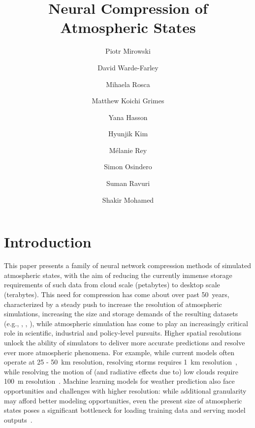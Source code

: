 \documentclass[11pt, a4paper, logo, copyright, numbering]{googledeepmind}
\title{Neural Compression of Atmospheric States}
\author[1,*]{Piotr Mirowski}
\author[1,*]{David Warde-Farley}
\author[1]{Mihaela Rosca}
\author[1]{Matthew Koichi Grimes}
\author[1]{Yana Hasson}
\author[1]{Hyunjik Kim}
\author[1]{Mélanie Rey}
\author[1]{Simon Osindero}
\author[1,\Cross]{Suman Ravuri}
\author[1,\Cross]{Shakir Mohamed}
\affil[*]{Equal contributions}
\affil[1]{Google DeepMind}
\affil[\Cross]{Senior authors}
\begin{document}
\maketitle



\section{Introduction}
\label{sx:introduction}

This paper presents a family of neural network compression methods of simulated atmospheric states, with the aim of reducing the currently immense storage requirements of such data from cloud scale (petabytes) to desktop scale (terabytes). 
This need for compression has come about over past 50~years, characterized by a steady push to increase the resolution of atmospheric simulations, increasing the size and storage demands of the resulting datasets (e.g., \citet{neumann2019assessing}, \citet{schneider2023harnessing}, \citet{essd-16-2113-2024}), while atmospheric simulation has come to play an increasingly critical role in scientific, industrial and policy-level pursuits.
Higher spatial resolutions unlock the ability of simulators to deliver more accurate predictions and resolve ever more atmospheric phenomena.
For example, while current models often operate at 25 - 50~km resolution, resolving storms requires 1~km resolution~\citep{stevens2020added}, while resolving the motion of (and radiative effects due to) low clouds require 100~m resolution~\citep{schneider2017earth,satoh2019global}.
Machine learning models for weather prediction also face opportunities and challenges with higher resolution: while additional granularity may afford better modeling opportunities, even the present size of atmospheric states poses a significant bottleneck for loading training data and serving model outputs~\citep{chantry2021opportunities}.
\end{document}
